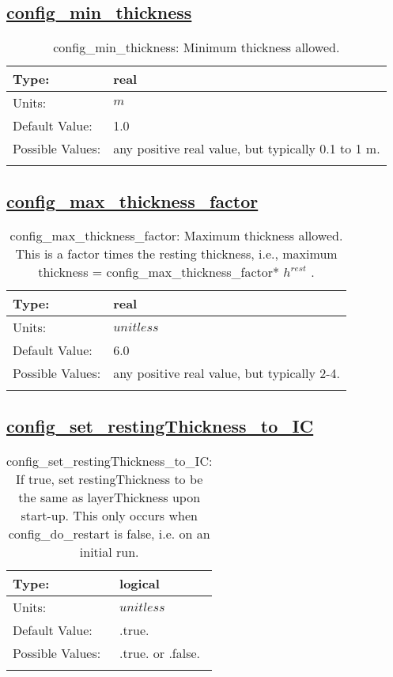 \subsection[config\_min\_thickness]{\hyperref[sec:nm_tab_ALE_vertical_grid]{config\_min\_thickness}}
\label{subsec:nm_sec_config_min_thickness}
\begin{center}
\begin{longtable}{| p{2.0in} | p{4.0in} |}
    \hline
    Type: & real \\
    \hline
    Units: & $m$ \\
    \hline
    Default Value: & 1.0 \\
    \hline
    Possible Values: & any positive real value, but typically 0.1 to 1 m. \\
    \hline
    \caption{config\_min\_thickness: Minimum thickness allowed.}
\end{longtable}
\end{center}
\subsection[config\_max\_thickness\_factor]{\hyperref[sec:nm_tab_ALE_vertical_grid]{config\_max\_thickness\_factor}}
\label{subsec:nm_sec_config_max_thickness_factor}
\begin{center}
\begin{longtable}{| p{2.0in} | p{4.0in} |}
    \hline
    Type: & real \\
    \hline
    Units: & $unitless$ \\
    \hline
    Default Value: & 6.0 \\
    \hline
    Possible Values: & any positive real value, but typically 2-4. \\
    \hline
    \caption{config\_max\_thickness\_factor:  Maximum thickness allowed.  This is a factor times the resting thickness, i.e., maximum thickness = config\_max\_thickness\_factor* $h^{rest}$ .}
\end{longtable}
\end{center}
\subsection[config\_set\_restingThickness\_to\_IC]{\hyperref[sec:nm_tab_ALE_vertical_grid]{config\_set\_restingThickness\_to\_IC}}
\label{subsec:nm_sec_config_set_restingThickness_to_IC}
\begin{center}
\begin{longtable}{| p{2.0in} | p{4.0in} |}
    \hline
    Type: & logical \\
    \hline
    Units: & $unitless$ \\
    \hline
    Default Value: & .true. \\
    \hline
    Possible Values: & .true. or .false. \\
    \hline
    \caption{config\_set\_restingThickness\_to\_IC: If true, set restingThickness to be the same as layerThickness upon start-up.  This only occurs when config\_do\_restart is false, i.e. on an initial run.}
\end{longtable}
\end{center}
